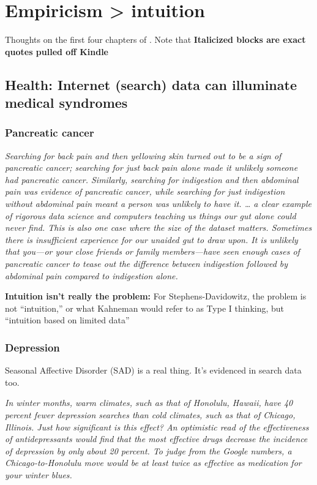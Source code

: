 \documentclass[]{book}
\theoremstyle{definition}
\theoremstyle{definition}
\theoremstyle{definition}
\theoremstyle{remark}
\begin{document}
\chapter{Empiricism \textgreater{}
intuition}\label{empiricism-intuition}

Thoughts on the first four chapters of \citet{stephens2017everybody}.
Note that \textbf{Italicized blocks are exact quotes pulled off Kindle}

\section{Health: Internet (search) data can illuminate medical
syndromes}\label{health-internet-search-data-can-illuminate-medical-syndromes}

\subsection{Pancreatic cancer}\label{pancreatic-cancer}

\emph{Searching for back pain and then yellowing skin turned out to be a
sign of pancreatic cancer; searching for just back pain alone made it
unlikely someone had pancreatic cancer. Similarly, searching for
indigestion and then abdominal pain was evidence of pancreatic cancer,
while searching for just indigestion without abdominal pain meant a
person was unlikely to have it. \ldots{} a clear example of rigorous
data science and computers teaching us things our gut alone could never
find. This is also one case where the size of the dataset matters.
Sometimes there is insufficient experience for our unaided gut to draw
upon. It is unlikely that you---or your close friends or family
members---have seen enough cases of pancreatic cancer to tease out the
difference between indigestion followed by abdominal pain compared to
indigestion alone.}

\textbf{Intuition isn't really the problem:} For Stephens-Davidowitz,
the problem is not ``intuition,'' or what Kahneman would refer to as
Type I thinking, but ``intuition based on limited data''

\subsection{Depression}\label{depression}

Seasonal Affective Disorder (SAD) is a real thing. It's evidenced in
search data too.

\emph{In winter months, warm climates, such as that of Honolulu, Hawaii,
have 40 percent fewer depression searches than cold climates, such as
that of Chicago, Illinois. Just how significant is this effect? An
optimistic read of the effectiveness of antidepressants would find that
the most effective drugs decrease the incidence of depression by only
about 20 percent. To judge from the Google numbers, a
Chicago-to-Honolulu move would be at least twice as effective as
medication for your winter blues.}
\end{document}
